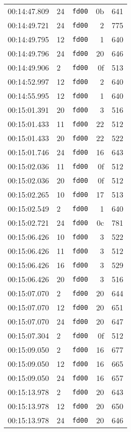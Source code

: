 \documentclass{article}
\begin{document}
\begin{longtable}{lllrr}
00:14:47.809 & 24 & \texttt{fd00} & 0b & 641 \\
00:14:49.721 & 24 & \texttt{fd00} & 2 & 775 \\
00:14:49.795 & 12 & \texttt{fd00} & 1 & 640 \\
00:14:49.796 & 24 & \texttt{fd00} & 20 & 646 \\
00:14:49.906 & 2 & \texttt{fd00} & 0f & 513 \\
00:14:52.997 & 12 & \texttt{fd00} & 2 & 640 \\
00:14:55.995 & 12 & \texttt{fd00} & 1 & 640 \\
00:15:01.391 & 20 & \texttt{fd00} & 3 & 516 \\
00:15:01.433 & 11 & \texttt{fd00} & 22 & 512 \\
00:15:01.433 & 20 & \texttt{fd00} & 22 & 522 \\
00:15:01.746 & 24 & \texttt{fd00} & 16 & 643 \\
00:15:02.036 & 11 & \texttt{fd00} & 0f & 512 \\
00:15:02.036 & 20 & \texttt{fd00} & 0f & 512 \\
00:15:02.265 & 10 & \texttt{fd00} & 17 & 513 \\
00:15:02.549 & 2 & \texttt{fd00} & 1 & 640 \\
00:15:02.721 & 24 & \texttt{fd00} & 0c & 781 \\
00:15:06.426 & 10 & \texttt{fd00} & 3 & 522 \\
00:15:06.426 & 11 & \texttt{fd00} & 3 & 512 \\
00:15:06.426 & 16 & \texttt{fd00} & 3 & 529 \\
00:15:06.426 & 20 & \texttt{fd00} & 3 & 516 \\
00:15:07.070 & 2 & \texttt{fd00} & 20 & 644 \\
00:15:07.070 & 12 & \texttt{fd00} & 20 & 651 \\
00:15:07.070 & 24 & \texttt{fd00} & 20 & 647 \\
00:15:07.304 & 2 & \texttt{fd00} & 0f & 512 \\
00:15:09.050 & 2 & \texttt{fd00} & 16 & 677 \\
00:15:09.050 & 12 & \texttt{fd00} & 16 & 665 \\
00:15:09.050 & 24 & \texttt{fd00} & 16 & 657 \\
00:15:13.978 & 2 & \texttt{fd00} & 20 & 643 \\
00:15:13.978 & 12 & \texttt{fd00} & 20 & 650 \\
00:15:13.978 & 24 & \texttt{fd00} & 20 & 646 \\

\end{longtable}
\end{document}
